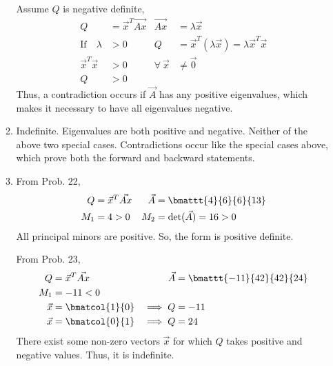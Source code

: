 \begin{enumerate}
\begin{enumerate}
                    Assume $ Q $ is negative definite,
                    \begin{align}
                        Q                        & = \vec{x}^T \vec{Ax}          &
                        \vec{Ax}                 & = \lambda \vec{x}               \\
                        \text{If} \quad  \lambda & > 0                           &
                        Q                        & = \vec{x}^T (\lambda \vec{x})
                        = \lambda \vec{x}^T \vec{x}                                \\
                        \vec{x}^T \vec{x}        & > 0                           &
                        \forall\ \vec{x}         & \neq \vec{0}                    \\
                        Q                        & > 0
                    \end{align}
                    Thus, a contradiction occurs if $ \vec{A} $ has any positive
                    eigenvalues, which makes it necessary to have all eigenvalues
                    negative.

              \item Indefinite. Eigenvalues are both positive and negative.
                    Neither of the above two special cases. Contradictions occur like
                    the special cases above, which prove both the forward and backward
                    statements.

              \item From Prob. 22,
                    \begin{align}
                        Q       & = \vec{x}^T \vec{Ax}     &
                        \vec{A} & = \bmattt{4}{6}{6}{13}     \\
                        M_1     & = 4 > 0                  &
                        M_2     & = \det(\vec{A}) = 16 > 0   \\
                    \end{align}
                    All principal minors are positive. So, the form is positive
                    definite. \par
                    From Prob. 23,
                    \begin{align}
                        Q          & = \vec{x}^T \vec{Ax}       &
                        \vec{A}    & = \bmattt{-11}{42}{42}{24}   \\
                        M_1        & = -11 < 0                    \\
                        \vec{x}    & = \bmatcol{1}{0}           &
                        \implies Q & = -11                        \\
                        \vec{x}    & = \bmatcol{0}{1}           &
                        \implies Q & = 24
                    \end{align}
                    There exist some non-zero vectors $ \vec{x} $ for which $ Q $ takes
                    positive and negative values. Thus, it is indefinite.
          \end{enumerate}
\end{enumerate}
